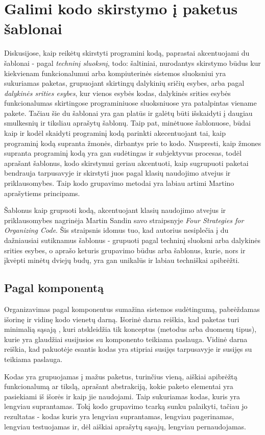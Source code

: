 \section{Galimi kodo skirstymo į paketus šablonai}
Diskusijose, kaip reikėtų skirstyti programini kodą, paprastai akcentuojami du šablonai - pagal \textit{techninį sluoksnį}, todo: šaltiniai, nurodantys skirstymo būdus
kur kiekvienam funkcionalumui arba kompiuterinės sistemos sluoksniui yra sukuriamas paketas,
grupuojant skirtingų dalykinių sričių esybes, arba pagal \textit{dalykinės srities esybes}, kur vienos esybės kodas, dalykinės srities
esybės funkcionalumas skirtingose programiniuose sluoksniuose yra patalpintas viename pakete.
Tačiau šie du šablonai yra gan platūs ir galėtų būti išskaidyti į daugiau smulkesnių ir tiksliau aprašytų šablonų.
Taip pat, minėtuose šablonuose, būdai kaip ir kodėl skaidyti programinį kodą parinkti akecentuojant tai, kaip programinį
kodą supranta žmonės, dirbantys prie to kodo.
Nuspresti, kaip žmones supranta programinį kodą yra gan sudėtingas ir subjektyvus procesas, todėl aprašant šablonus, kodo skirstymui
geriau akcentuoti, kaip sugrupuoti paketai bendrauja tarpusavyje ir skirstyti juos pagal klasių naudojimo atvejus ir priklausomybes.
Taip kodo grupavimo metodai yra labiau artimi Martino aprašytiems principams.


Šablonus kaip grupuoti kodą, akcentuojant klasių naudojimo atvejus ir priklausomybes nagrinėja Martin Sandin savo
straipsnyje \textit{Four Strategies for Organizing Code}.
Šis straipsnis idomus tuo, kad autorius nesiplečia į du dažniausiai sutiknamus šablonus - grupuoti pagal techninį sluoksni arba dalykinės srities esybes,
o aprašo keturis grupavimo būdus arba šablonus, kurie, nors ir įkvėpti minėtų dviejų budų, yra gan unikalūs ir labiau techniškai apibrėžti.
\subsection{Pagal komponentą}
Organizavimas pagal komponentus sumažina sistemos sudėtingumą, pabrėždamas išorinę ir vidinę kodo vienetų darną.
Išorinė darna reiškia, kad paketas turi minimalią sąsają , kuri atskleidžia tik konceptus (metodus arba duomenų tipus),
kurie yra glaudžiai susijusios su komponento teikiama paslauga.
Vidinė darna reiškia, kad pakuotėje esantis kodas yra stipriai susijęs tarpusavyje ir susijęs su teikiama paslauga.

Kodas yra grupuojamas į mažus paketus, turinčius vieną, aiškiai apibrėžtą funkcionalumą ar tikslą, aprašant abstrakciją, kokie paketo elementai
yra pasiekiami iš išorės ir kaip jie naudojami.
Taip sukuriamas kodas, kuris yra lengviau suprantamas.
Tokį kodo grupavimo tcarką sunku palaikyti, tačiau jo rezultatas - kodas kuris yra lengviau suprantamas, lengviau pagerinamas, lengviau testuojamas
ir, dėl aiškiai aprašytų sąsajų, lengviau pernaudojamas.

